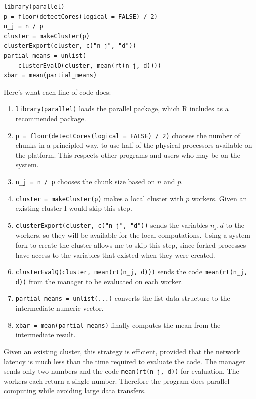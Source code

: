 \documentclass[12pt]{article}
\begin{document}
\begin{verbatim}
library(parallel)
p = floor(detectCores(logical = FALSE) / 2)
n_j = n / p
cluster = makeCluster(p)
clusterExport(cluster, c("n_j", "d"))
partial_means = unlist(
    clusterEvalQ(cluster, mean(rt(n_j, d))))
xbar = mean(partial_means)
\end{verbatim}

Here's what each line of code does:

\begin{enumerate}
    \item \texttt{library(parallel)} loads the parallel package, which R
        includes as a recommended package.
    \item \texttt{p = floor(detectCores(logical = FALSE) / 2)}
        chooses the number of chunks in a principled way, to use half of
        the physical processors available on the platform. This respects
        other programs and users who may be on the system.
    \item \texttt{n\_j = n / p} chooses the chunk size based on $n$ and
        $p$. 
    \item \texttt{cluster = makeCluster(p)} makes a local cluster with $p$
        workers. Given an existing cluster I would skip this step.
    \item \texttt{clusterExport(cluster, c("n\_j", "d"))} sends the
        variables $n_j, d$ to the workers, so they will be available for
        the local computations.
        Using a system fork to create the cluster allows me to
        skip this step, since forked processes have access to the variables
        that existed when they were created.
    \item \texttt{clusterEvalQ(cluster, mean(rt(n\_j, d)))} sends the code
        \texttt{mean(rt(n\_j, d))} from the manager to be evaluated on each
        worker.
    \item \texttt{partial\_means = unlist(...)} converts the list data
        structure to the intermediate numeric vector.
    \item \texttt{xbar = mean(partial\_means)} finally computes the mean
        from the intermediate result.
\end{enumerate}

Given an existing cluster, this strategy is efficient, provided that the
network latency is much less than the time required to evaluate the code.
The manager sends only two numbers and the code \texttt{mean(rt(n\_j, d))}
for evaluation. The workers each return a single number. Therefore the
program does parallel computing while avoiding large data transfers. 
\end{document}
